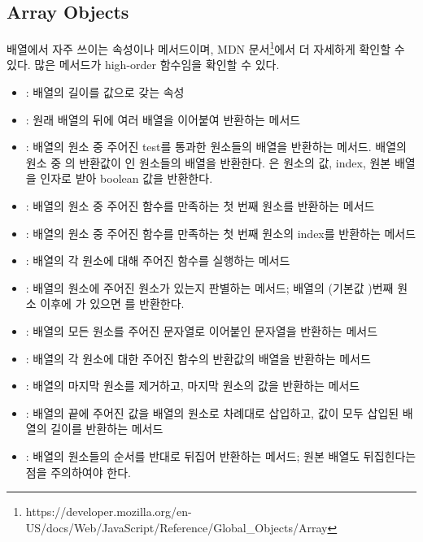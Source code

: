 \subsection*{Array Objects}

배열에서 자주 쓰이는 속성이나 메서드이며, MDN 문서\footnote{https://developer.mozilla.org/en-US/docs/Web/JavaScript/Reference/Global\_Objects/Array}에서 더 자세하게 확인할 수 있다. 많은 메서드가 high-order 함수임을 확인할 수 있다.

\begin{itemize}
    \item {}: 배열의 길이를 값으로 갖는 속성
    \item {}: 원래 배열의 뒤에 여러 배열을 이어붙여 반환하는 메서드
    \item {}: 배열의 원소 중 주어진 test를 통과한 원소들의 배열을 반환하는 메서드. 배열의 원소 중 의 반환값이 인 원소들의 배열을 반환한다. 은 원소의 값, index, 원본 배열을 인자로 받아 boolean 값을 반환한다.
    \item {}: 배열의 원소 중 주어진 함수를 만족하는 첫 번째 원소를 반환하는 메서드
    \item {}: 배열의 원소 중 주어진 함수를 만족하는 첫 번째 원소의 index를 반환하는 메서드
    \item {}: 배열의 각 원소에 대해 주어진 함수를 실행하는 메서드
    \item {}: 배열의 원소에 주어진 원소가 있는지 판별하는 메서드; 배열의 (기본값 )번째 원소 이후에 가 있으면 를 반환한다.
    \item {}: 배열의 모든 원소를 주어진 문자열로 이어붙인 문자열을 반환하는 메서드
    \item {}: 배열의 각 원소에 대한 주어진 함수의 반환값의 배열을 반환하는 메서드
    \item {}: 배열의 마지막 원소를 제거하고, 마지막 원소의 값을 반환하는 메서드
    \item {}: 배열의 끝에 주어진 값을 배열의 원소로 차례대로 삽입하고, 값이 모두 삽입된 배열의 길이를 반환하는 메서드
    \item {}: 배열의 원소들의 순서를 반대로 뒤집어 반환하는 메서드; 원본 배열도 뒤집힌다는 점을 주의하여야 한다.

\end{itemize}
